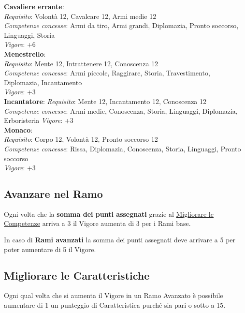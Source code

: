 \documentclass[12pt,a4paper,twoside,openany]{book}
\begin{document}
\begin{multicols}{2}
\textbf{Cavaliere errante}:\\
\textit{Requisito}: Volontà 12, Cavalcare 12, Armi medie 12\\
\textit{Competenze concesse}: Armi da tiro, Armi grandi, Diplomazia, Pronto soccorso, Linguaggi, Storia\\
\textit{Vigore}: +6\\

\textbf{Menestrello}:\\
\textit{Requisito}: Mente 12, Intrattenere 12, Conoscenza 12\\
\textit{Competenze concesse}: Armi piccole, Raggirare, Storia, Travestimento, Diplomazia, Incantamento\\
\textit{Vigore}: +3\\

\textbf{Incantatore}:
\textit{Requisito}: Mente 12, Incantamento 12, Conoscenza 12\\
\textit{Competenze concesse}: Armi medie, Conoscenza, Storia, Linguaggi, Diplomazia, Erboristeria 
\textit{Vigore}: +3\\

\textbf{Monaco}:\\
\textit{Requisito}: Corpo 12, Volontà 12, Pronto soccorso 12\\
\textit{Competenze concesse}: Rissa, Diplomazia, Conoscenza, Storia, Linguaggi, Pronto soccorso\\
\textit{Vigore}: +3\\


\subsection{Avanzare nel Ramo}

Ogni volta che la \textbf{somma dei punti assegnati} grazie al \hyperlink{Migliorare le Competenze}{Migliorare le Competenze} arriva a 3 il Vigore aumenta di 3 per i Rami base.

In caso di \textbf{Rami avanzati} la somma dei punti assegnati deve arrivare a 5 per poter aumentare di 5 il Vigore.

\subsection{Migliorare le Caratteristiche}

Ogni qual volta che si aumenta il Vigore in un Ramo Avanzato è possibile aumentare di 1 un punteggio di Caratteristica purché sia pari o sotto a 15.


\end{multicols}
\end{document}
